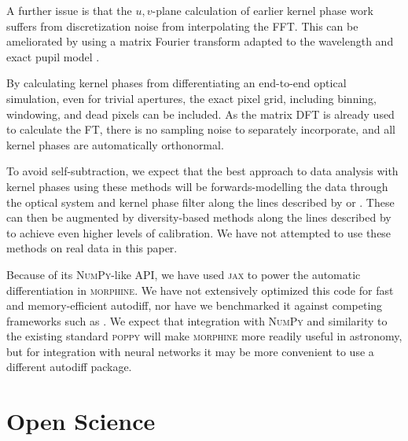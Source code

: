 \documentclass[modern]{aastex63}
\begin{document}
A further issue is that the $u,v$-plane calculation of earlier kernel phase work suffers from discretization noise from interpolating the FFT. This can be ameliorated by using a matrix Fourier transform adapted to the wavelength and exact pupil model \citep{martinache_habilitation}.

By calculating kernel phases from differentiating an end-to-end optical simulation, even for trivial apertures, the exact pixel grid, including binning, windowing, and dead pixels can be included. As the matrix DFT is already used to calculate the FT, there is no sampling noise to separately incorporate, and all kernel phases are automatically orthonormal.

To avoid self-subtraction, we expect that the best approach to data analysis with kernel phases using these methods will be forwards-modelling the data through the optical system and kernel phase filter along the lines described by \citet{pueyo16} or \citet{martinache20}. These can then be augmented by diversity-based methods along the lines described by \citet{ireland13} to achieve even higher levels of calibration. We have not attempted to use these methods on real data in this paper.


Because of its \textsc{NumPy}-like API, we have used \textsc{jax} to power the automatic differentiation in \textsc{morphine}. We have not extensively optimized this code for fast and memory-efficient autodiff, nor have we benchmarked it against competing frameworks such as . We expect that integration with \textsc{NumPy} and similarity to the existing standard \textsc{poppy} will make \textsc{morphine} more readily useful in astronomy, but for integration with neural networks it may be more convenient to use a different autodiff package. 

\section{Open Science}
\label{sec:open}
\end{document}
